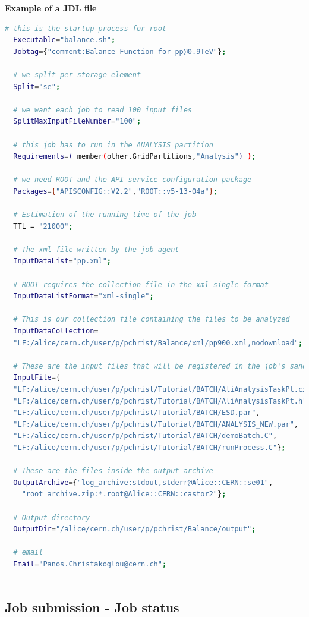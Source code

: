 \vspace{0.5 cm}
\textbf{Example of a JDL file}
\begin{lstlisting}[language=bash]
  # this is the startup process for root
  Executable="balance.sh";
  Jobtag={"comment:Balance Function for pp@0.9TeV"};
  
  # we split per storage element
  Split="se";
  
  # we want each job to read 100 input files
  SplitMaxInputFileNumber="100";
  
  # this job has to run in the ANALYSIS partition
  Requirements=( member(other.GridPartitions,"Analysis") );
  
  # we need ROOT and the API service configuration package
  Packages={"APISCONFIG::V2.2","ROOT::v5-13-04a"};

  # Estimation of the running time of the job
  TTL = "21000";
  
  # The xml file written by the job agent
  InputDataList="pp.xml";
  
  # ROOT requires the collection file in the xml-single format
  InputDataListFormat="xml-single";
  
  # This is our collection file containing the files to be analyzed
  InputDataCollection=
  "LF:/alice/cern.ch/user/p/pchrist/Balance/xml/pp900.xml,nodownload";
  
  # These are the input files that will be registered in the job's sandbox
  InputFile={
  "LF:/alice/cern.ch/user/p/pchrist/Tutorial/BATCH/AliAnalysisTaskPt.cxx",
  "LF:/alice/cern.ch/user/p/pchrist/Tutorial/BATCH/AliAnalysisTaskPt.h",
  "LF:/alice/cern.ch/user/p/pchrist/Tutorial/BATCH/ESD.par", 
  "LF:/alice/cern.ch/user/p/pchrist/Tutorial/BATCH/ANALYSIS_NEW.par", 
  "LF:/alice/cern.ch/user/p/pchrist/Tutorial/BATCH/demoBatch.C",
  "LF:/alice/cern.ch/user/p/pchrist/Tutorial/BATCH/runProcess.C"};
  
  # These are the files inside the output archive
  OutputArchive={"log_archive:stdout,stderr@Alice::CERN::se01",
    "root_archive.zip:*.root@Alice::CERN::castor2"};
  
  # Output directory
  OutputDir="/alice/cern.ch/user/p/pchrist/Balance/output";
  
  # email
  Email="Panos.Christakoglou@cern.ch";
  
\end{lstlisting}


\subsection{Job submission - Job status}

